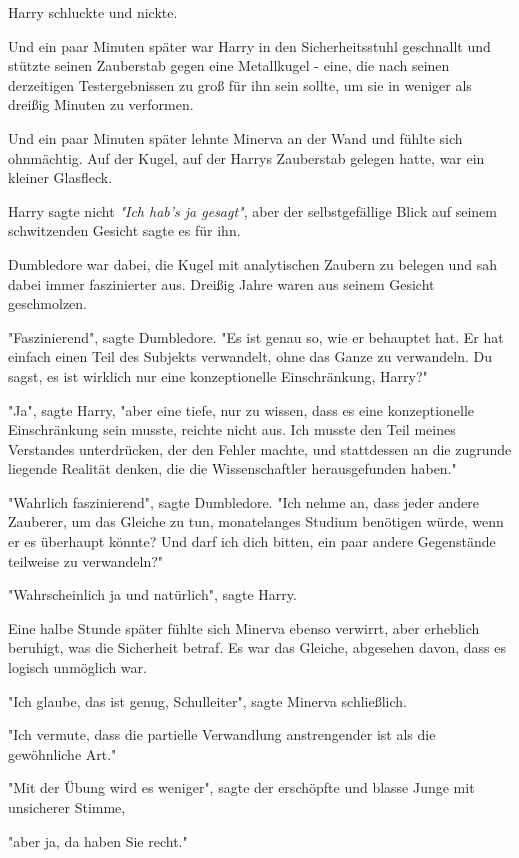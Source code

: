 {Harry schluckte und nickte.

Und ein paar Minuten später war Harry in den Sicherheitsstuhl geschnallt und stützte seinen Zauberstab gegen eine Metallkugel - eine, die nach seinen derzeitigen Testergebnissen zu groß für ihn sein sollte, um sie in weniger als dreißig Minuten zu verformen.

Und ein paar Minuten später lehnte Minerva an der Wand und fühlte sich ohnmächtig. Auf der Kugel, auf der Harrys Zauberstab gelegen hatte, war ein kleiner Glasfleck.

Harry sagte nicht \emph{"Ich hab's ja gesagt"}, aber der selbstgefällige Blick auf seinem schwitzenden Gesicht sagte es für ihn.

Dumbledore war dabei, die Kugel mit analytischen Zaubern zu belegen und sah dabei immer faszinierter aus. Dreißig Jahre waren aus seinem Gesicht geschmolzen.

"Faszinierend", sagte Dumbledore. "Es ist genau so, wie er behauptet hat. Er hat einfach einen Teil des Subjekts verwandelt, ohne das Ganze zu verwandeln. Du sagst, es ist wirklich nur eine konzeptionelle Einschränkung, Harry?"

"Ja", sagte Harry, "aber eine tiefe, nur zu wissen, dass es eine konzeptionelle Einschränkung sein musste, reichte nicht aus. Ich musste den Teil meines Verstandes unterdrücken, der den Fehler machte, und stattdessen an die zugrunde liegende Realität denken, die die Wissenschaftler herausgefunden haben."

"Wahrlich faszinierend", sagte Dumbledore. "Ich nehme an, dass jeder andere Zauberer, um das Gleiche zu tun, monatelanges Studium benötigen würde, wenn er es überhaupt könnte? Und darf ich dich bitten, ein paar andere Gegenstände teilweise zu verwandeln?"

"Wahrscheinlich ja und natürlich", sagte Harry.

Eine halbe Stunde später fühlte sich Minerva ebenso verwirrt, aber erheblich beruhigt, was die Sicherheit betraf. Es war das Gleiche, abgesehen davon, dass es logisch unmöglich war.

"Ich glaube, das ist genug, Schulleiter", sagte Minerva schließlich.

"Ich vermute, dass die partielle Verwandlung anstrengender ist als die gewöhnliche Art."

"Mit der Übung wird es weniger", sagte der erschöpfte und blasse Junge mit unsicherer Stimme,

"aber ja, da haben Sie recht."

}
